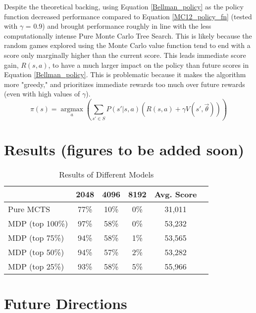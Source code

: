 \documentclass{article}
\DeclareMathOperator*{\argmax}{argmax}
\begin{document}
Despite the theoretical backing, using Equation \ref{Bellman_policy} as the policy function decreased performance compared to Equation \ref{MC12_policy_fn} (tested with $\gamma$ = 0.9) and brought performance roughly in line with the less computationally intense Pure Monte Carlo Tree Search.  This is likely because the random games explored using the Monte Carlo value function tend to end with a score only marginally higher than the current score.  This leads immediate score gain, $R(s, a)$, to have a much larger impact on the policy than future scores in Equation \ref{Bellman_policy}.  This is problematic because it makes the algorithm more "greedy," and prioritizes immediate rewards too much over future rewards (even with high values of $\gamma$).
\begin{equation}
\label{Bellman_policy}
\pi(s) = \argmax\limits_{a}\left( \sum\limits_{s' \in S} P(s'|s, a)(R(s,a) + \gamma V(s', \vec{\theta})) \right)
\end{equation}


\section{Results (figures to be added soon)}


\begin{table}[h]
  \caption{Results of Different Models}
  \begin{tabular}{|l|c|c|c|c|c|}
    \hline
    & 2048 & 4096 & 8192 & Avg. Score \\
    \hline
    Pure MCTS & 77\% & 10\% & 0\% & 31,011 \\
    \hline
    MDP (top 100\%) & \cellcolor{green!25}97\% & \cellcolor{green!25}58\% & 0\% & 53,232\\
    \hline
    MDP (top 75\%) & 94\% & \cellcolor{green!25}58\% & 1\% & 53,565\\
    \hline
    MDP (top 50\%) & 94\% & 57\% & 2\% & 53,282\\
    \hline
    MDP (top 25\%) & 93\% & \cellcolor{green!25}58\% & \cellcolor{green!25}5\% & \cellcolor{green!25}55,966 \\
    \hline
  \end{tabular}
\end{table}

\section{Future Directions}
\end{document}
